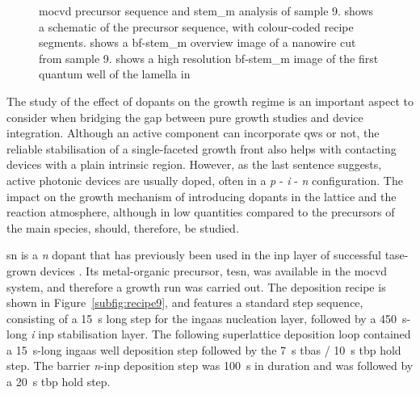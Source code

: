\begin{figure}
{    }
    \caption[\acs{mocvd} precursor sequence and \acs{stem_m} analysis of sample 9.]{\acs{mocvd} precursor sequence and \acs{stem_m} analysis of sample 9.  shows a schematic of the precursor sequence, with colour-coded recipe segments.  shows a \acs{bf}-\acs{stem_m} overview image of a nanowire cut from sample 9.  shows a high resolution \acs{bf}-\acs{stem_m} image of the first quantum well of the lamella in }
    \label{fig:s9_recipe_stem}
\end{figure}

The study of the effect of dopants on the  growth regime is an important aspect to consider when bridging the gap between pure growth studies and device integration. Although an active component can incorporate \acl{qw}s or not, the reliable stabilisation of a single-faceted growth front also helps with contacting devices with a plain intrinsic region. However, as the last sentence suggests, active photonic devices are usually doped, often in a \textit{p} - \textit{i} - \textit{n} configuration. The impact on the growth mechanism of introducing dopants in the lattice and the reaction atmosphere, although in low quantities compared to the precursors of the main species, should, therefore, be studied.

\Acl{sn} is a \textit{n} dopant \cite{Vedel2023} that has previously been used in the \acs{inp} layer of successful \acs{tase}-grown devices \cite{Wen2022}. Its metal-organic precursor, \acf{tesn}, was available in the \acs{mocvd} system, and therefore a growth run was carried out. The deposition recipe is shown in Figure~\ref{subfig:recipe9}, and features a standard step sequence, consisting of a \qty{15}{\second} long step for the \acs{ingaas} nucleation layer, followed by a \qty{450}{\second}-long \textit{i} \acs{inp} stabilisation layer. The following superlattice deposition loop contained a \qty{15}{\second}-long \acs{ingaas} well deposition step followed by the \qty{7}{\second} \acs{tbas} / \qty{10}{\second} \acs{tbp} hold step. The barrier \textit{n}-\acs{inp} deposition step was \qty{100}{\second} in duration and was followed by a \qty{20}{\second} \acs{tbp} hold step.

